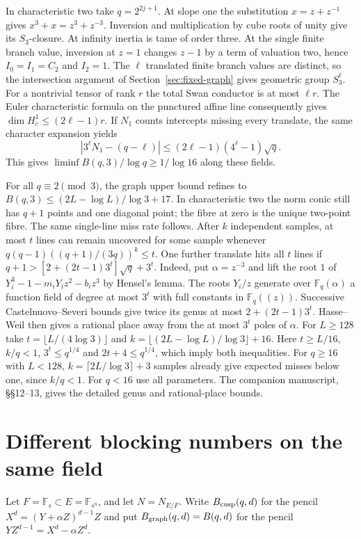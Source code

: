 \documentclass[preprint,12pt,numbers]{elsarticle}
\begin{document}
In characteristic two take $q=2^{2j+1}$. At slope one the substitution
$x=z+z^{-1}$ gives $x^3+x=z^3+z^{-3}$. Inversion and multiplication
by cube roots of unity give its $S_3$-closure. At infinity inertia is
tame of order three. At the single finite branch value, inversion at
$z=1$ changes $z-1$ by a term of valuation two, hence
$I_0=I_1=C_2$ and $I_2=1$. The $\ell$ translated finite branch values
are distinct, so the intersection argument of Section~\ref{sec:fixed-graph}
gives geometric group $S_3^\ell$. For a nontrivial tensor of rank $r$
the total Swan conductor is at most $\ell r$. The Euler characteristic
formula on the punctured affine line consequently gives
$\dim H_c^1\le(2\ell-1)r$. If $N_1$ counts intercepts missing every
translate, the same character expansion yields
\[
  |3^\ell N_1-(q-\ell)|\le(2\ell-1)(4^\ell-1)\sqrt q .
\]
This gives $\liminf B(q,3)/\log q\ge1/\log16$ along these fields.

For all $q\equiv2\pmod3$, the graph upper bound refines to
$B(q,3)\le(2L-\log L)/\log3+17$. In characteristic two the norm conic
still has $q+1$ points and one diagonal point; the fibre at zero is
the unique two-point fibre. The same single-line miss rate follows.
After $k$ independent samples, at most $t$ lines can remain uncovered
for some sample whenever $q(q-1)((q+1)/(3q))^k\le t$. One further
translate hits all $t$ lines if
$q+1>[2+(2t-1)3^t]\sqrt q+3^t$. Indeed, put $\alpha=z^{-3}$ and
lift the root $1$ of $Y_i^3-1-m_iY_iz^2-b_iz^3$ by Hensel's lemma.
The roots $Y_i/z$ generate over $\mathbb F_q(\alpha)$ a function field of degree at most
$3^t$ with full constants in $\mathbb F_q((z))$. Successive
Castelnuovo--Severi bounds give twice its genus at most
$2+(2t-1)3^t$. Hasse--Weil then gives a rational place away from
the at most $3^t$ poles of $\alpha$. For $L\ge128$ take
$t=\lfloor L/(4\log3)\rfloor$ and $k=\lfloor(2L-\log L)/\log3\rfloor+16$.
Here $t\ge L/16$, $k/q<1$, $3^t\le q^{1/4}$ and
$2t+4\le q^{1/4}$, which imply both inequalities.
For $q\ge16$ with $L<128$, $k=\lceil2L/\log3\rceil+3$ samples already
give expected misses below one, since $k/q<1$. For $q<16$ use all
parameters. The companion manuscript, \S\S12--13, gives the detailed
genus and rational-place bounds.

\section{Different blocking numbers on the same field}\label{sec:norm-spheres}

Let $F=\mathbb F_s\subset E=\mathbb F_{s^n}$, and let $N=N_{E/F}$.
Write $B_{\rm cusp}(q,d)$ for the pencil $X^d=(Y+\alpha Z)^{d-1}Z$
and put $B_{\rm graph}(q,d)=B(q,d)$ for the pencil $YZ^{d-1}=X^d-\alpha Z^d$.
\end{document}
